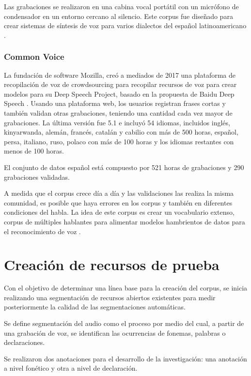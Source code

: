 \documentclass[a4paper,12pt,twoside]{report}
\begin{document}
Las grabaciones se realizaron en una cabina vocal portátil con un micrófono de condensador en un entorno cercano al silencio. Este corpus fue diseñado para crear sistemas de síntesis de voz para varios dialectos del español latinoamericano \cite{googleTTSLatinAmericanSpanishCorpus}.

\subsection{Common Voice}

La fundación de software Mozilla, creó a mediados de 2017 una plataforma de recopilación de voz de crowdsourcing para recopilar recursos de voz para crear modelos para su Deep Speech Project, basado en la propuesta de Baidu Deep Speech \cite{deepspeeh}. Usando una plataforma web, los usuarios registran frases cortas y también validan otras grabaciones, teniendo una cantidad cada vez mayor de grabaciones. La última versión fue 5.1 e incluyó 54 idiomas, incluidos inglés, kinyarwanda, alemán, francés, catalán y cabilio con más de 500 horas, español, persa, italiano, ruso, polaco con más de 100 horas y los idiomas restantes con menos de 100 horas.

El conjunto de datos español está compuesto por 521 horas de grabaciones y 290 grabaciones validadas.

A medida que el corpus crece día a día y las validaciones las realiza la misma comunidad, es posible que haya errores en los corpus y también en diferentes condiciones del habla. La idea de este corpus es crear un vocabulario extenso, corpus de múltiples hablantes para alimentar modelos hambrientos de datos para el reconocimiento de voz \cite{Common-Voice}.

\chapter{Creación de recursos de prueba}

Con el objetivo de determinar una línea base para la creación del corpus, se inicia realizando una segmentación de recursos abiertos existentes para medir posteriormente la calidad de las segmentaciones automáticas.

Se define segmentación del audio como el proceso por medio del cual, a partir de una grabación de voz, se identifican las ocurrencias de fonemas, palabras o declaraciones. 

Se realizaron dos anotaciones para el desarrollo de la investigación: una anotación a nivel fonético y otra a nivel de declaración.
\end{document}
